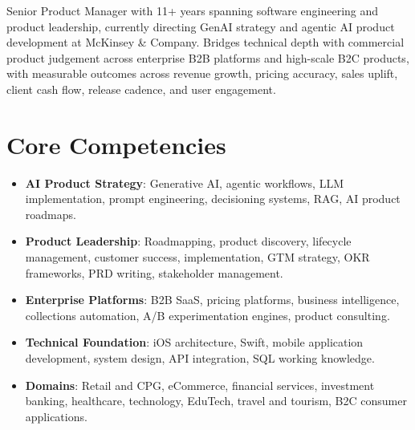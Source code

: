 \documentclass[11pt,a4paper,sans]{moderncv}
\begin{document}
\makecvtitle


\vspace{6pt}
\small{Senior Product Manager with 11+ years spanning software engineering and product leadership, currently directing GenAI strategy and agentic AI product development at McKinsey \& Company. Bridges technical depth with commercial product judgement across enterprise B2B platforms and high-scale B2C products, with measurable outcomes across revenue growth, pricing accuracy, sales uplift, client cash flow, release cadence, and user engagement.}


\section{Core Competencies}
\vspace{1pt}
\begin{itemize}
\item \textbf{AI Product Strategy}: Generative AI, agentic workflows, LLM implementation, prompt engineering, decisioning systems, RAG, AI product roadmaps.
\item \textbf{Product Leadership}: Roadmapping, product discovery, lifecycle management, customer success, implementation, GTM strategy, OKR frameworks, PRD writing, stakeholder management.
\item \textbf{Enterprise Platforms}: B2B SaaS, pricing platforms, business intelligence, collections automation, A/B experimentation engines, product consulting.
\item \textbf{Technical Foundation}: iOS architecture, Swift, mobile application development, system design, API integration, SQL working knowledge.
\item \textbf{Domains}: Retail and CPG, eCommerce, financial services, investment banking, healthcare, technology, EduTech, travel and tourism, B2C consumer applications.
\end{itemize}

\end{document}
